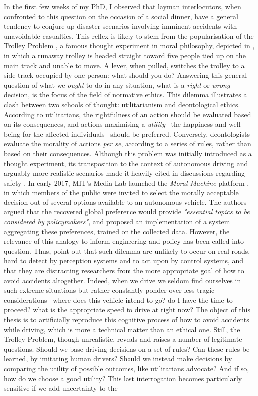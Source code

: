 In the first few weeks of my PhD, I observed that layman interlocutors, when confronted to this question on the occasion of a social dinner, have a general tendency to conjure up disaster scenarios involving imminent accidents with unavoidable casualties. This reflex is likely to stem from the popularisation of the Trolley Problem \citep{Foot1967}, a famous thought experiment in moral philosophy, depicted in , in which a runaway trolley is headed straight toward five people tied up on the main track and unable to move. A lever, when pulled, switches the trolley to a side track occupied by one person: what should you do? Answering this general question of what we \emph{ought} to do in any situation, what is a \emph{right} or \emph{wrong} decision, is the focus of the field of {normative ethics}. This dilemma illustrates a clash between two schools of thought: utilitarianism and deontological ethics. According to utilitarians, the rightfulness of an action should be evaluated based on its consequences, and actions maximising a \emph{utility} --the happiness and well-being for the affected individuals-- should be preferred. Conversely, deontologists evaluate the morality of actions \emph{per se}, according to a series of rules, rather than based on their consequences. Although this problem was initially introduced as a thought experiment, its transposition to the context of autonomous driving and arguably more realistic scenarios made it heavily cited in discussions regarding safety \citep[e.g.][]{Lin2015,Bonnefon2016,Gogoll2017}. In early 2017, MIT’s Media Lab launched the \emph{Moral Machine} platform \citep{Awad2018}, in which members of the public were invited to select the morally acceptable decision out of several options available to an autonomous vehicle. The authors argued that the recovered global preference would provide \emph{"essential topics to be considered by policymakers"}, and \citep{Noothigattu2018} proposed an implementation of a system aggregating these preferences, trained on the collected data. However, the relevance of this analogy to inform engineering and policy has been called into question. Thus, \citet{DeFreitas2019} point out that such dilemma are unlikely to occur on real roads, hard to detect by perception systems and to act upon by control systems, and that they are distracting researchers from the more appropriate goal of how to avoid accidents altogether. Indeed, when we drive we seldom find ourselves in such extreme situations but rather constantly ponder over less tragic considerations-- where does this vehicle intend to go? do I have the time to proceed? what is the appropriate speed to drive at right now? The object of this thesis is to artificially reproduce this cognitive process of how to avoid accidents while driving, which is more a technical matter than an ethical one. Still, the Trolley Problem, though unrealistic, reveals and raises a number of legitimate questions. Should we base driving decisions on a set of rules? Can these rules be learned, \eg by imitating human drivers? Should we instead make decisions by comparing the utility of possible outcomes, like utilitarians advocate? And if so, how do we choose a good utility? This last interrogation becomes particularly sensitive if we add uncertainty to the 